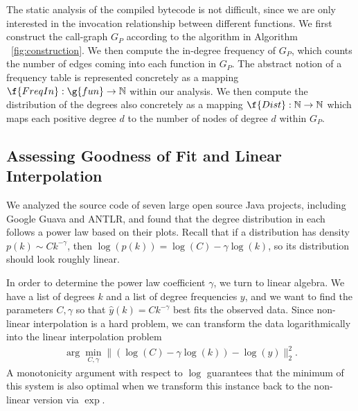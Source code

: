 \documentclass[11pt,a4paper,twocolumn]{article}
\begin{document}
\begin{singlespace}
The static analysis of the compiled bytecode is not difficult, since we are
only interested in the invocation relationship between different functions. We
first construct the call-graph $G_P$ according to the algorithm in Algorithm
~\ref{fig:construction}. We then compute the in-degree frequency of $G_P$,
which counts the number of edges coming into each function in $G_P$. The
abstract notion of a frequency table is represented concretely as a mapping
$\f{FreqIn}:\g{fun}\to\mathbb{N}$ within our analysis. We then compute the
distribution of the degrees also concretely as a mapping $\f{Dist}:\mathbb{N}
\to\mathbb{N}$ which maps each positive degree $d$ to the number of nodes of
degree $d$ within $G_P$.

\subsection{Assessing Goodness of Fit and Linear Interpolation}

We analyzed the source code of seven large open source Java projects, including
Google Guava and ANTLR, and found that the degree distribution in each follows
a power law based on their  plots. Recall that if a distribution has
density $p(k)\sim Ck^{-\gamma}$, then $\log(p(k))=\log(C)-\gamma\log(k)$, so
its distribution should look roughly linear.

In order to determine the power law coefficient $\gamma$, we turn to linear
algebra. We have a list of degrees $k$ and a list of degree frequencies $y$,
and we want to find the parameters $C,\gamma$ so that $\hat{y}(k)=Ck^{-\gamma}$
best fits the observed data. Since non-linear interpolation is a hard problem,
we can transform the data logarithmically into the linear interpolation
problem
\begin{align}
\label{eq:linint}
\arg\min_{C,\gamma} \|(\log(C)-\gamma\log(k))-\log(y)\|_2^2.
\end{align}
A monotonicity argument with respect to $\log$ guarantees that the minimum
of this system is also optimal when we transform this instance back to the
non-linear version via $\exp$.


\end{singlespace}
\end{document}
